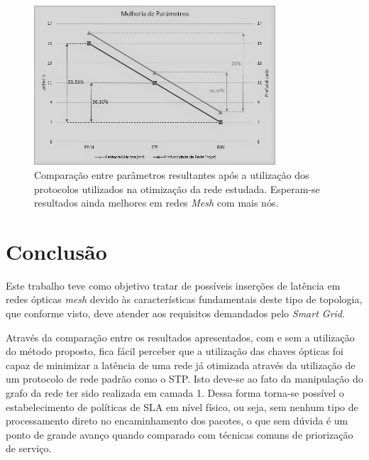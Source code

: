 \documentclass[12pt]{article}
\begin{document}
\begin{figure} %
	\centering
	\includegraphics[width=9cm]{Tabela2GraficoPB}
	\caption{Comparação entre parâmetros resultantes após a utilização dos protocolos utilizados na otimização da rede estudada. Esperam-se resultados ainda melhores em redes \emph{Mesh} com mais nós.}
	\label{fig_tab_percentual}
\end{figure}

\section{Conclusão}

%
Este trabalho teve como objetivo tratar de possíveis inserções de latência em redes ópticas \emph{mesh} devido às características fundamentais deste tipo de topologia, que conforme visto, deve atender aos requisitos demandados pelo \emph{Smart Grid}.

Através da comparação entre os resultados apresentados, com e sem a utilização do método proposto, fica fácil perceber que a utilização das chaves ópticas foi capaz de minimizar a latência de uma rede já otimizada através da utilização de um protocolo de rede padrão como o STP. Isto deve-se ao fato da manipulação do grafo da rede ter sido realizada em camada 1. Dessa forma torna-se possível o estabelecimento de políticas de SLA em nível físico, ou seja, sem nenhum tipo de processamento direto no encaminhamento dos pacotes, o que sem dúvida é um ponto de grande avanço quando comparado com técnicas comuns de priorização de serviço.
\end{document}
